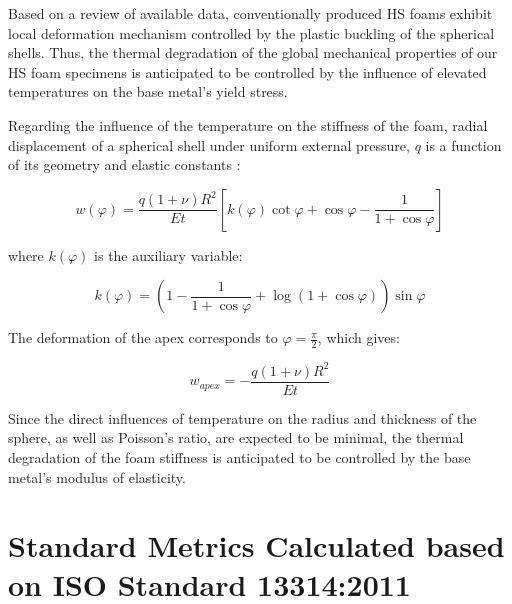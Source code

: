 \documentclass[review]{elsarticle}
\begin{document}

Based on a review of available data, conventionally produced HS foams exhibit local deformation mechanism controlled by the plastic buckling of the spherical shells. Thus, the thermal degradation of the global mechanical properties of our HS foam specimens is anticipated to be controlled by the influence of elevated temperatures on the base metal's yield stress.

\FloatBarrier

Regarding the influence of the temperature on the stiffness of the foam, radial displacement of a spherical shell under uniform external pressure, $q$ is a function of its geometry and elastic constants \cite{TimGer2009}:

\begin{equation}\label{Eq6}
w(\varphi)=\frac{q(1+\nu)R^2}{Et}\left [ k(\varphi)\cot\varphi+\cos \varphi- \frac{1}{1+\cos\varphi} \right ]
\end{equation}

where $k(\varphi)$ is the auxiliary variable:

\begin{equation}\label{Eq7}
k(\varphi)=\left ( 1- \frac{1}{1+\cos\varphi} + \log(1+\cos\varphi) \right ) \sin \varphi
\end{equation}

The deformation of the apex corresponds to $\varphi=\frac{\pi}{2}$, which gives:

\begin{equation}\label{Eq8}
w_{apex}=-\frac{q(1+\nu)R^2}{Et}
\end{equation}

Since the direct influences of temperature on the radius and thickness of the sphere, as well as Poisson's ratio, are expected to be minimal, the thermal degradation of the foam stiffness is anticipated to be controlled by the base metal's modulus of elasticity.

\section{Standard Metrics Calculated based on ISO Standard 13314:2011}
\end{document}
